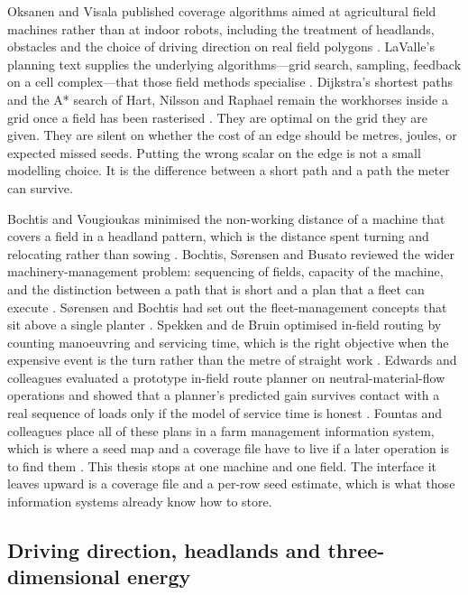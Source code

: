 Oksanen and Visala published coverage algorithms aimed at agricultural field machines rather than at indoor robots, including the treatment of headlands, obstacles and the choice of driving direction on real field polygons \cite{oksanen2009}. LaValle's planning text supplies the underlying algorithms---grid search, sampling, feedback on a cell complex---that those field methods specialise \cite{lavalle2006}. Dijkstra's shortest paths and the A* search of Hart, Nilsson and Raphael remain the workhorses inside a grid once a field has been rasterised \cite{dijkstra1959,hart1968}. They are optimal on the grid they are given. They are silent on whether the cost of an edge should be metres, joules, or expected missed seeds. Putting the wrong scalar on the edge is not a small modelling choice. It is the difference between a short path and a path the meter can survive.

Bochtis and Vougioukas minimised the non-working distance of a machine that covers a field in a headland pattern, which is the distance spent turning and relocating rather than sowing \cite{bochtis2008}. Bochtis, S{\o}rensen and Busato reviewed the wider machinery-management problem: sequencing of fields, capacity of the machine, and the distinction between a path that is short and a plan that a fleet can execute \cite{bochtis2014}. S{\o}rensen and Bochtis had set out the fleet-management concepts that sit above a single planter \cite{sorensen2010}. Spekken and de Bruin optimised in-field routing by counting manoeuvring and servicing time, which is the right objective when the expensive event is the turn rather than the metre of straight work \cite{spekken2013}. Edwards and colleagues evaluated a prototype in-field route planner on neutral-material-flow operations and showed that a planner's predicted gain survives contact with a real sequence of loads only if the model of service time is honest \cite{edwards2017}. Fountas and colleagues place all of these plans in a farm management information system, which is where a seed map and a coverage file have to live if a later operation is to find them \cite{fountas2015}. This thesis stops at one machine and one field. The interface it leaves upward is a coverage file and a per-row seed estimate, which is what those information systems already know how to store.

\subsection{Driving direction, headlands and three-dimensional energy}

